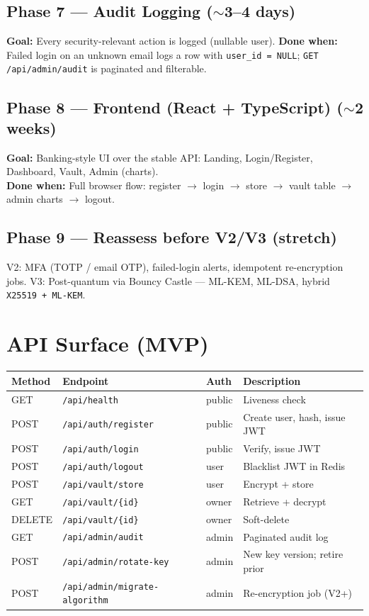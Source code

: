 \documentclass[11pt,a4paper]{article}
\newcommand{\code}[1]{\texttt{#1}}
\begin{document}
\subsection{Phase 7 — Audit Logging ($\sim$3–4 days)}
\textbf{Goal:} Every security-relevant action is logged (nullable user).
\textbf{Done when:} Failed login on an unknown email logs a row with \code{user\_id = NULL};
\code{GET /api/admin/audit} is paginated and filterable.

\subsection{Phase 8 — Frontend (React + TypeScript) ($\sim$2 weeks)}
\textbf{Goal:} Banking-style UI over the stable API: Landing, Login/Register, Dashboard, Vault, Admin (charts).\\
\textbf{Done when:} Full browser flow: register $\to$ login $\to$ store $\to$ vault table $\to$ admin charts $\to$ logout.

\subsection{Phase 9 — Reassess before V2/V3 (stretch)}
V2: MFA (TOTP / email OTP), failed-login alerts, idempotent re-encryption jobs.
V3: Post-quantum via Bouncy Castle — ML-KEM, ML-DSA, hybrid \code{X25519 + ML-KEM}.

\section{API Surface (MVP)}
\renewcommand{\arraystretch}{1.25}
\begin{longtable}{p{1.6cm} p{5cm} p{1.6cm} p{4.5cm}}
\hline
\textbf{Method} & \textbf{Endpoint} & \textbf{Auth} & \textbf{Description} \\ \hline
GET & \code{/api/health} & public & Liveness check \\
POST & \code{/api/auth/register} & public & Create user, hash, issue JWT \\
POST & \code{/api/auth/login} & public & Verify, issue JWT \\
POST & \code{/api/auth/logout} & user & Blacklist JWT in Redis \\
POST & \code{/api/vault/store} & user & Encrypt + store \\
GET & \code{/api/vault/\{id\}} & owner & Retrieve + decrypt \\
DELETE & \code{/api/vault/\{id\}} & owner & Soft-delete \\
GET & \code{/api/admin/audit} & admin & Paginated audit log \\
POST & \code{/api/admin/rotate-key} & admin & New key version; retire prior \\
POST & \code{/api/admin/migrate-algorithm} & admin & Re-encryption job (V2+) \\ \hline
\end{longtable}
\end{document}
